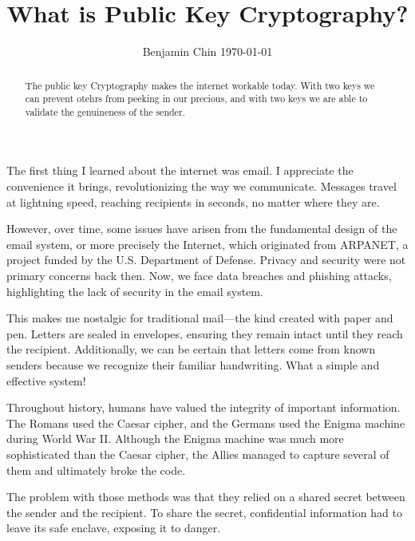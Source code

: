 \documentclass[11pt]{article}
\begin{document}
\title{What is Public Key Cryptography?}
\author{Benjamin Chin \today}
\date{} %

\maketitle

\maketitle

\begin{abstract}
The public key Cryptography makes the internet workable today. With two keys we can prevent otehrs from peeking in our precious, and with two keys we are able to validate the genuineness of the sender. 
\end{abstract}

The first thing I learned about the internet was email. I appreciate the convenience it brings, revolutionizing the way we communicate. Messages travel at lightning speed, reaching recipients in seconds, no matter where they are.

However, over time, some issues have arisen from the fundamental design of the email system, or more precisely the Internet, which originated from ARPANET, a project funded by the U.S. Department of Defense. Privacy and security were not primary concerns back then. Now, we face data breaches and phishing attacks, highlighting the lack of security in the email system.

This makes me nostalgic for traditional mail—the kind created with paper and pen. Letters are sealed in envelopes, ensuring they remain intact until they reach the recipient. Additionally, we can be certain that letters come from known senders because we recognize their familiar handwriting. What a simple and effective system!

Throughout history, humans have valued the integrity of important information. The Romans used the Caesar cipher, and the Germans used the Enigma machine during World War II. Although the Enigma machine was much more sophisticated than the Caesar cipher, the Allies managed to capture several of them and ultimately broke the code.

The problem with those methods was that they relied on a shared secret between the sender and the recipient. To share the secret, confidential information had to leave its safe enclave, exposing it to danger.
\end{document}
